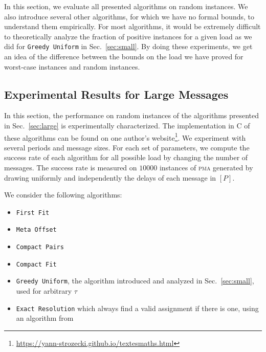 \documentclass[a4paper,UKenglish,cleveref, autoref, thm-restate]{lipics-v2019}
\newcommand\pma{\textsc{pma}\xspace}
\newcommand\firstfit{\texttt{First Fit}\xspace}
\newcommand\compactpair{\texttt{Compact Pairs}\xspace}
\newcommand\metaoffset{\texttt{Meta Offset}\xspace}
\newcommand\greedyuniform{\texttt{Greedy Uniform}\xspace}
\newcommand\compactfit{\texttt{Compact Fit}\xspace}
\begin{document}
In this section, we evaluate all presented algorithms on random instances. We also introduce several other algorithms, for which we have no formal bounds, to understand them empirically. 
For most algorithms, it would be extremely difficult to theoretically analyze the fraction of positive instances for a given load as we did for \greedyuniform in Sec.~\ref{sec:small}. By doing these experiments, we get an idea of the difference between the bounds on the load we have proved for worst-case instances and random instances.


\subsection{Experimental Results for Large Messages} \label{sec:perf_large}


In this section, the performance on random instances of the algorithms presented in Sec.~\ref{sec:large} is experimentally characterized. The implementation in C of these algorithms can be found on one author's website\footnote{\url{https://yann-strozecki.github.io/textesmaths.html}}. We experiment with several periods and message sizes. For each set of parameters, we compute the success rate of each algorithm for all possible load by changing the number of messages. The success rate is measured on $10000$ instances of \pma generated by drawing uniformly and independently the delays of each message in $[P]$. 

We consider the following algorithms:
\begin{itemize}
  \item \firstfit
  \item \metaoffset
  \item \compactpair
  \item \compactfit
  \item \greedyuniform, the algorithm introduced and analyzed in Sec.~\ref{sec:small}, used for arbitrary $\tau$
  \item \texttt{Exact Resolution} which always find a valid assignment if there is one, using an algorithm from~\cite{bartharxiv2018deterministic}  
\end{itemize}
\end{document}
